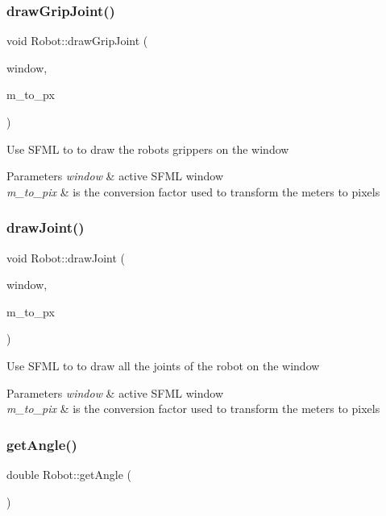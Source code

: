 \subsubsection{\texorpdfstring{draw\+Grip\+Joint()}{drawGripJoint()}}
{\footnotesize\ttfamily void Robot\+::draw\+Grip\+Joint (\begin{DoxyParamCaption}\item[{sf\+::\+Render\+Window \&}]{window,  }\item[{double}]{m\+\_\+to\+\_\+px }\end{DoxyParamCaption})}

Use S\+F\+ML to to draw the robot\textquotesingle{}s grippers on the window 
\begin{DoxyParams}{Parameters}
{\em window} & active S\+F\+ML window \\
\hline
{\em m\+\_\+to\+\_\+pix} & is the conversion factor used to transform the meters to pixels \\
\hline
\end{DoxyParams}
\mbox{\label{class_robot_a94bec26489e5354d1b9106bbd0e59f00}} 
\subsubsection{\texorpdfstring{draw\+Joint()}{drawJoint()}}
{\footnotesize\ttfamily void Robot\+::draw\+Joint (\begin{DoxyParamCaption}\item[{sf\+::\+Render\+Window \&}]{window,  }\item[{double}]{m\+\_\+to\+\_\+px }\end{DoxyParamCaption})}

Use S\+F\+ML to to draw all the joints of the robot on the window 
\begin{DoxyParams}{Parameters}
{\em window} & active S\+F\+ML window \\
\hline
{\em m\+\_\+to\+\_\+pix} & is the conversion factor used to transform the meters to pixels \\
\hline
\end{DoxyParams}
\mbox{\label{class_robot_a41a470133819059706aab8a8d546f6bc}} 
\subsubsection{\texorpdfstring{get\+Angle()}{getAngle()}}
{\footnotesize\ttfamily double Robot\+::get\+Angle (\begin{DoxyParamCaption}{ }\end{DoxyParamCaption})}

